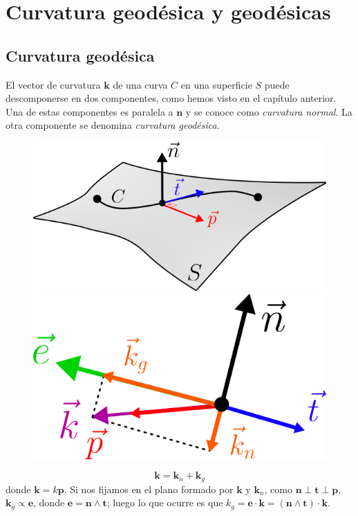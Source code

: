 \chapter{Curvatura geodésica y geodésicas}

\section{Curvatura geodésica}
\large 

El vector de curvatura $\mathbf{k}$ de una curva $C$ en una superficie $S$ puede descomponerse en dos componentes, como hemos visto en el capítulo anterior. Una de estas componentes es paralela a $\mathbf{n}$ y se conoce como \emph{curvatura normal}. La otra componente se denomina \emph{curvatura geodésica}. 
\begin{figure}
    \centering
    \includegraphics[scale=.4]{FOTOS/curva_geo_1.png}
    \includegraphics[scale=.4]{FOTOS/curva_geo_2.png}
\end{figure}
$$
\mathbf{k}=\mathbf{k}_n+\mathbf{k}_g
$$
donde $\mathbf{k}=k\mathbf{p}$. Si nos fijamos en el plano formado por $\mathbf{k}$ y $\mathbf{k}_n$, como $\mathbf{n}\perp \mathbf{t}\perp \mathbf{p}$, $\mathbf{k}_g\propto \mathbf{e}$, donde $\mathbf{e}=\mathbf{n}\wedge \mathbf{t}$; luego lo que ocurre es que $k_g=\mathbf{e\cdot k}=(\mathbf{n}\wedge \mathbf{t})\cdot \mathbf{k}$.\\

